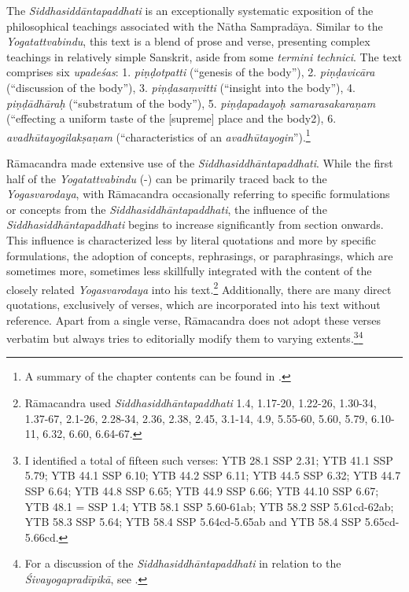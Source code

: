 The \emph{Siddhasiddāntapaddhati} is an exceptionally systematic exposition of the philosophical teachings associated with the Nātha Sampradāya. Similar to the \emph{Yogatattvabindu}, this text is a blend of prose and verse, presenting complex teachings in relatively simple Sanskrit, aside from some \textit{termini technici}. The text comprises six \textit{upadeśas}: 1. \textit{piṇḍotpatti} (``genesis of the body''), 2. \textit{piṇḍavicāra} (``discussion of the body''), 3. \textit{piṇḍasaṃvitti} (``insight into the body''), 4. \textit{piṇḍādhāraḥ} (``substratum of the body''), 5. \textit{piṇḍapadayoḥ samarasakaraṇam} (``effecting a uniform taste of the [supreme] place and the body2), 6. \textit{avadhūtayogilakṣaṇam} (``characteristics of an \textit{avadhūtayogin}'').\footnote{A summary of the chapter contents can be found in \citeauthor[2016: -]{ssplonavla}.}

Rāmacandra made extensive use of the \emph{Siddhasiddhāntapaddhati}. While the first half of the \emph{Yogatattvabindu} (-) can be primarily traced back to the \emph{Yogasvarodaya}, with Rāmacandra occasionally referring to specific formulations or concepts from the \emph{Siddhasiddhāntapaddhati}, the influence of the \emph{Siddhasiddhāntapaddhati} begins to increase significantly from section  onwards. This influence is characterized less by literal quotations and more by specific formulations, the adoption of concepts, rephrasings, or paraphrasings, which are sometimes more, sometimes less skillfully integrated with the content of the closely related \emph{Yogasvarodaya} into his text.\footnote{Rāmacandra used \emph{Siddhasiddhāntapaddhati} 1.4, 1.17-20, 1.22-26, 1.30-34, 1.37-67, 2.1-26, 2.28-34, 2.36, 2.38, 2.45, 3.1-14, 4.9, 5.55-60, 5.60, 5.79, 6.10-11, 6.32, 6.60, 6.64-67.} Additionally, there are many direct quotations, exclusively of verses, which are incorporated into his text without reference. Apart from a single verse, Rāmacandra does not adopt these verses verbatim but always tries to editorially modify them to varying extents.\footnote{I identified a total of fifteen such verses: YTB 28.1 \approx SSP 2.31; YTB 41.1 \approx SSP 5.79; YTB 44.1 \approx SSP 6.10; YTB 44.2 \approx SSP 6.11; YTB 44.5 \approx SSP 6.32; YTB 44.7 \approx SSP 6.64; YTB 44.8 \approx SSP 6.65; YTB 44.9 \approx SSP 6.66; YTB 44.10 \approx SSP 6.67; YTB 48.1 = SSP 1.4; YTB 58.1 \approx SSP 5.60-61ab; YTB 58.2 \approx SSP 5.61cd-62ab; YTB 58.3 \approx SSP 5.64; YTB 58.4 \approx SSP 5.64cd-5.65ab and YTB 58.4 \approx SSP 5.65cd-5.66cd.}\footnote{For a discussion of the \emph{Siddhasiddhāntapaddhati} in relation to the \emph{Śivayogapradīpikā}, see \citeauthor[20: 147-152]{powell2023}.}

